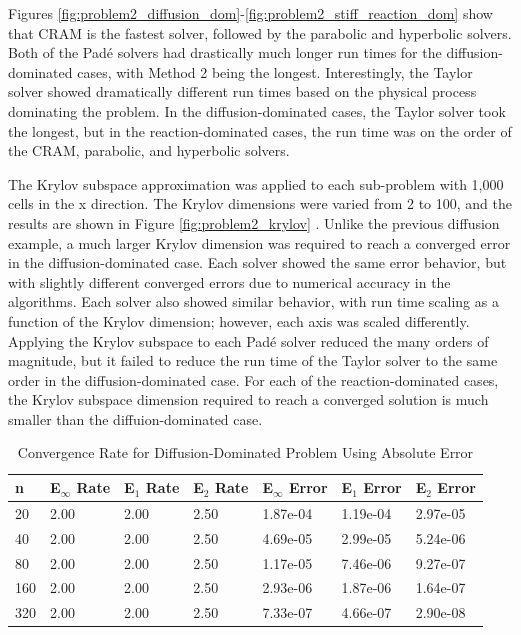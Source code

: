 Figures \ref{fig:problem2_diffusion_dom}-\ref{fig:problem2_stiff_reaction_dom} show that CRAM is the fastest solver, followed by the parabolic and hyperbolic solvers. Both of the Pad\'e solvers had drastically much longer run times for the diffusion-dominated cases, with Method 2 being the longest. Interestingly, the Taylor solver showed dramatically different run times based on the physical process dominating the problem. In the diffusion-dominated cases, the Taylor solver took the longest, but in the reaction-dominated cases, the run time was on the order of the CRAM, parabolic, and hyperbolic solvers. 

The Krylov subspace approximation was applied to each sub-problem with 1,000 cells in the x direction. The Krylov dimensions were varied from 2 to 100, and the results are shown in Figure \ref{fig:problem2_krylov} . Unlike the previous diffusion example, a much larger Krylov dimension was required to reach a converged error in the diffusion-dominated case. Each solver showed the same error behavior, but with slightly different converged errors due to numerical accuracy in the algorithms. Each solver also showed similar behavior, with run time scaling as a function of the Krylov dimension; however, each axis was scaled differently. Applying the Krylov subspace to each Pad\'e solver reduced the many orders of magnitude, but it failed to reduce the run time of the Taylor solver to the same order in the diffusion-dominated case. For each of the reaction-dominated cases, the Krylov subspace dimension required to reach a converged solution is much smaller than the diffuion-dominated case. 

\clearpage

\begin{table}[h]
   \caption{\label{tab:diffusion_spatial_convergence_diffusion_dom} Convergence Rate for Diffusion-Dominated Problem Using Absolute Error}
   \centering
   \begin{tabular}{lllllll}
   \hline
    n & E${}_{\infty}$ Rate & E${}_{1}$ Rate & E${}_{2}$ Rate & E${}_{\infty}$ Error & E${}_{1}$ Error & E${}_{2}$ Error\\
   \hline
    20 & 2.00 & 2.00 & 2.50 & 1.87e-04 & 1.19e-04 & 2.97e-05 \\ 
    40 & 2.00 & 2.00 & 2.50 & 4.69e-05 & 2.99e-05 & 5.24e-06 \\ 
    80 & 2.00 & 2.00 & 2.50 & 1.17e-05 & 7.46e-06 & 9.27e-07 \\ 
   160 & 2.00 & 2.00 & 2.50 & 2.93e-06 & 1.87e-06 & 1.64e-07 \\ 
   320 & 2.00 & 2.00 & 2.50 & 7.33e-07 & 4.66e-07 & 2.90e-08 \\ 
   \hline
   \end{tabular}
\end{table}

